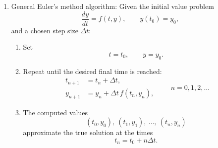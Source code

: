 \documentclass{article}
\begin{document}
\begin{enumerate}
\begin{enumerate}
\item General $n$th time step: $y_{n+1}=y_n+\Delta t f_n$
\begin{itemize}
\item Following the second tangent line in above example gives $y_2=y_1 + \Delta t f_1$. In general,
\[
y_{n+1}=y_n+\Delta t f_n \quad \left(\text{rearranged as } \frac{y_{n+1}-y_n}{\Delta t} = f_n \right)
\]
\item Example: Returning to $y' = 2y$, we get 
\begin{align*}
y_{n+1} 
&= y_n + \Delta t f_n \\
&= y_n + \Delta t 2 y_n \\
&= (1+2\Delta t) y_{n} \\
&= (1+2\Delta t)^2 y_{n-1} \\
&= \vdots \\
&= (1+2\Delta t)^n y_0 \\
\end{align*}
If $y(0)=1$, say we are truly after an approximation to $y(1)$. Then if we take $n+1$ time steps ($\Delta t = \frac{1}{n}$)
\[
y_{n+1} = \left(1+\frac{2}{n} \right)^n \approx e^{2} \quad \left( \text{recall } (1+\frac{1}{n})^n \rightarrow e \right)
\]
and it looks like it is working!
\item Taking smaller steps ($\Delta t$) results in more steps needed (larger $n$) to get to end time $T$. So we converge to the true solution.
\item Draw on $y'=2y$ example 2 steps to $T=1$ via 4 steps. Close approximation in the end, but how much better?
\end{itemize}

\end{enumerate}

\item General Euler's method algorithm: Given the initial value problem
\[
\frac{dy}{dt}=f(t,y), \qquad y(t_0)=y_0,
\]
and a chosen step size $\Delta t$:
\begin{enumerate}
\item Set
\[
t=t_0,\qquad y=y_0.
\]
\item Repeat until the desired final time is reached:
\[
\boxed{
\begin{aligned}
t_{n+1} &= t_n+\Delta t,\\
y_{n+1} &= y_n+\Delta t\,f(t_n,y_n),
\end{aligned}
\qquad n=0,1,2,\ldots
}
\]

\item The computed values
\[
(t_0,y_0),\ (t_1,y_1),\ \ldots,\ (t_n,y_n)
\]
approximate the true solution at the times
\[
t_n=t_0+n\Delta t.
\]
\end{enumerate}


\end{enumerate}
\end{document}
